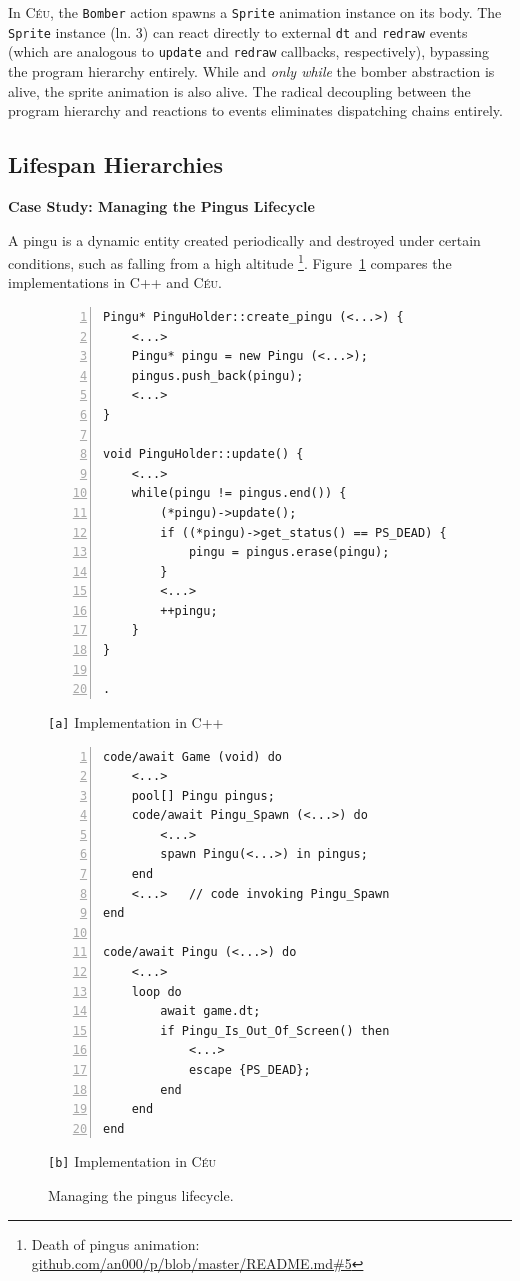 \documentclass{vgtc}                          %
\newcommand{\CEU}{\textsc{C\'{e}u}\xspace}
\newcommand{\code}[1] {{\small{\texttt{#1}}}}
\newcommand{\ax}{\code{[a]}\xspace}
\newcommand{\bx}{\code{[b]}\xspace}
\begin{document}
In \CEU, the \code{Bomber} action spawns a \code{Sprite} animation instance on
its body.
%
The \code{Sprite} instance (ln. 3) can react directly to external \code{dt} and
\code{redraw} events (which are analogous to \code{update} and \code{redraw}
callbacks, respectively), bypassing the program hierarchy entirely.
While and \emph{only while} the bomber abstraction is alive, the sprite
animation is also alive.
The radical decoupling between the program hierarchy and reactions to events
eliminates dispatching chains entirely.

\subsection{Lifespan Hierarchies}

\textbf{Case Study: Managing the Pingus Lifecycle}


A pingu is a dynamic entity created periodically and destroyed under certain
conditions, such as falling from a high altitude%
\footnote{Death of pingus animation: \url{github.com/an000/p/blob/master/README.md#5} }.
%
Figure~\ref{lst.pingus} compares the implementations in C++ and \CEU.

\begin{figure}[t]
\begin{minipage}[t]{0.50\linewidth}
\begin{lstlisting}[numbers=left,xleftmargin=3em]
Pingu* PinguHolder::create_pingu (<...>) {
    <...>
    Pingu* pingu = new Pingu (<...>);
    pingus.push_back(pingu);
    <...>
}

void PinguHolder::update() {
    <...>
    while(pingu != pingus.end()) {
        (*pingu)->update();
        if ((*pingu)->get_status() == PS_DEAD) {
            pingu = pingus.erase(pingu);
        }
        <...>
        ++pingu;
    }
}

.
\end{lstlisting}
\centering\small{\ax Implementation in C++}
\end{minipage}
%
\begin{minipage}[t]{0.50\linewidth}
\begin{lstlisting}[numbers=left,xleftmargin=3em]
code/await Game (void) do
    <...>
    pool[] Pingu pingus;
    code/await Pingu_Spawn (<...>) do
        <...>
        spawn Pingu(<...>) in pingus;
    end
    <...>   // code invoking Pingu_Spawn
end

code/await Pingu (<...>) do
    <...>
    loop do
        await game.dt;
        if Pingu_Is_Out_Of_Screen() then
            <...>
            escape {PS_DEAD};
        end
    end
end
\end{lstlisting}
\centering\small{\bx Implementation in \CEU}
\end{minipage}
\caption{ Managing the pingus lifecycle.
\label{lst.pingus}
}
\end{figure}
\end{document}
